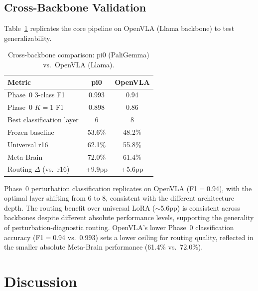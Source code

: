 \documentclass[10pt,twocolumn]{article}
\begin{document}
\subsection{Cross-Backbone Validation}
\label{sec:cross_backbone}

Table~\ref{tab:cross_backbone} replicates the core pipeline on OpenVLA (Llama backbone) to test generalizability.

\begin{table}[h]
\centering
\caption{Cross-backbone comparison: pi0 (PaliGemma) vs.\ OpenVLA (Llama).}
\label{tab:cross_backbone}
\small
\begin{tabular}{lcc}
\toprule
Metric & pi0 & OpenVLA \\
\midrule
Phase~0 3-class F1 & 0.993 & 0.94 \\
Phase~0 $K{=}1$ F1 & 0.898 & 0.86 \\
Best classification layer & 6 & 8 \\
Frozen baseline & 53.6\% & 48.2\% \\
Universal r16 & 62.1\% & 55.8\% \\
Meta-Brain & 72.0\% & 61.4\% \\
Routing $\Delta$ (vs.\ r16) & +9.9pp & +5.6pp \\
\bottomrule
\end{tabular}
\end{table}

Phase~0 perturbation classification replicates on OpenVLA (F1$=$0.94), with the optimal layer shifting from 6 to 8, consistent with the different architecture depth.
The routing benefit over universal LoRA (${\sim}$5.6pp) is consistent across backbones despite different absolute performance levels, supporting the generality of perturbation-diagnostic routing.
OpenVLA's lower Phase~0 classification accuracy (F1$=$0.94 vs.\ 0.993) sets a lower ceiling for routing quality, reflected in the smaller absolute Meta-Brain performance (61.4\% vs.\ 72.0\%).

\section{Discussion}
\label{sec:discussion}
\end{document}

